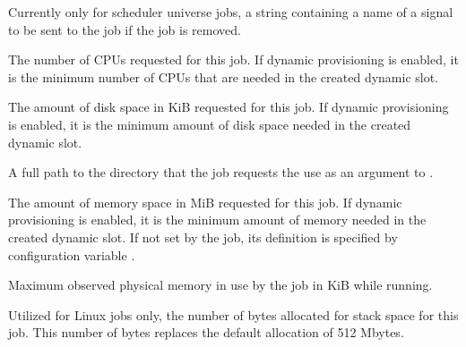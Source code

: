\begin{description}
\item[\AdAttr{RemoveKillSig}:]    Currently only for scheduler universe jobs,
a string containing a name of
a signal to be sent to the job if the job is removed.

\item[\AdAttr{RequestCpus}:]  The number of CPUs requested for this job.
If dynamic  provisioning is enabled,
it is the minimum number of CPUs that are needed in the created dynamic slot.

\item[\AdAttr{RequestDisk}:]  The amount of disk space in KiB requested 
for this job.
If dynamic  provisioning is enabled,
it is the minimum amount of disk space needed in the created dynamic slot.

\item[\AdAttr{RequestedChroot}:]  A full path to the directory that the job
requests the  use as an argument to .

\item[\AdAttr{RequestMemory}:]  The amount of memory space in MiB 
requested for this job.
If dynamic  provisioning is enabled,
it is the minimum amount of memory needed in the created dynamic slot.
If not set by the job, its definition is specified by 
configuration variable .

\item[\AdAttr{ResidentSetSize}:]  Maximum observed
physical memory in use by the job in KiB while running.

\item[\AdAttr{StackSize}:]   
Utilized for Linux jobs only, 
the number of bytes allocated for stack space for this job.
This number of bytes replaces the default allocation of 512 Mbytes.


\end{description}
